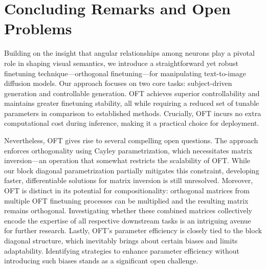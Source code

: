 \section{Concluding Remarks and Open Problems}

Building on the insight that angular relationships among neurons play a pivotal role in shaping visual semantics, we introduce a straightforward yet robust finetuning technique—orthogonal finetuning—for manipulating text-to-image diffusion models. Our approach focuses on two core tasks: subject-driven generation and controllable generation. OFT achieves superior controllability and maintains greater finetuning stability, all while requiring a reduced set of tunable parameters in comparison to established methods. Crucially, OFT incurs no extra computational cost during inference, making it a practical choice for deployment.

Nevertheless, OFT gives rise to several compelling open questions. The approach enforces orthogonality using Cayley parametrization, which necessitates matrix inversion—an operation that somewhat restricts the scalability of OFT. While our block diagonal parametrization partially mitigates this constraint, developing faster, differentiable solutions for matrix inversion is still unresolved. Moreover, OFT is distinct in its potential for compositionality: orthogonal matrices from multiple OFT finetuning processes can be multiplied and the resulting matrix remains orthogonal. Investigating whether these combined matrices collectively encode the expertise of all respective downstream tasks is an intriguing avenue for further research. Lastly, OFT's parameter efficiency is closely tied to the block diagonal structure, which inevitably brings about certain biases and limits adaptability. Identifying strategies to enhance parameter efficiency without introducing such biases stands as a significant open challenge.